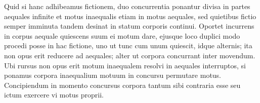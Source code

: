 \pend
\pstart
Quid si hanc adhibeamus fictionem, 
duo concurrentia ponantur divisa in partes aequales infinite
et motus inaequalis etiam in motus aequales, sed quietibus 
fictio semper imminuta tandem desinat in statum 
corporis continui. Oportet 
incurrens in corpus aequale quiescens
suum ei motum dare, ejusque loco 
duplici modo procedi posse in hac fictione, uno ut 
tunc cum unum quiescit, idque alternis; ita non opus erit 
reducere ad aequales; alter ut corpora concurrant inter movendum. Ubi rursus non opus erit 
motum inaequalem resolvi in 
aequales interruptos, si ponamus corpora inaequalium motuum 
in concursu permutare motus.
\pend
\pstart Concipiendum in momento concursus corpora tantum sibi contraria esse seu 
ictum exercere vi motus proprii.
\pend
